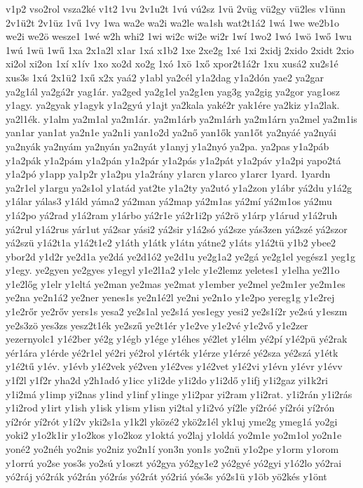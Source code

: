 {v1p2
vso2rol
vsza2ké
v1t2
1vu
2v1u2t
1vú
vú2sz
1vü
2vüg
vü2gy
vü2les
v1ünn
2v1ü2t
2v1üz
1vű
1vy
1wa
wa2e
wa2i
wa2le
wa1sh
wat2t1á2
1wá
1we
we2b1o
we2i
we2ö
wesze1
1wé
w2h
whi2
1wi
wi2c
wi2e
wi2r
1wí
1wo2
1wó
1wö
1wő
1wu
1wú
1wü
1wű
1xa
2x1a2l
x1ar
1xá
x1b2
1xe
2xe2g
1xé
1xi
2xidj
2xido
2xidt
2xio
xi2ol
xi2on
1xí
x1ív
1xo
xo2d
xo2g
1xó
1xö
1xő
xpor2t1á2r
1xu
xusá2
xu2s1é
xus3s
1xú
2x1ü2
1xű
x2x
yaá2
y1abl
ya2cél
y1a2dag
y1a2dón
yae2
ya2gar
ya2g1ál
ya2gá2r
yag1ár.
ya2ged
ya2g1el
ya2g1en
yag3g
ya2gig
ya2gor
yag1osz
y1agy.
ya2gyak
y1agyk
y1a2gyú
y1ajt
ya2kala
yaké2r
yak1ére
ya2kiz
y1a2lak.
ya2l1ék.
y1alm
ya2m1al
ya2m1ár.
ya2m1árb
ya2m1árh
ya2m1árn
ya2mel
ya2m1is
yan1ar
yan1at
ya2n1e
ya2n1i
yan1o2d
ya2nő
yan1ők
yan1őt
ya2nyáé
ya2nyái
ya2nyák
ya2nyám
ya2nyán
ya2nyát
y1anyj
y1a2nyó
ya2pa.
ya2pas
y1a2páb
y1a2pák
y1a2pám
y1a2pán
y1a2pár
y1a2pás
y1a2pát
y1a2páv
y1a2pi
yapo2tá
y1a2pó
y1app
ya1p2r
y1a2pu
y1a2rány
y1arcn
y1arco
y1arcr
1yard.
1yardn
ya2r1el
y1argu
ya2s1ol
y1atád
yat2te
y1a2ty
ya2utó
y1a2zon
y1ábr
yá2du
y1á2g
y1álar
yálas3
y1áld
yáma2
yá2man
yá2map
yá2m1as
yá2mí
yá2m1os
yá2mu
y1á2po
yá2rad
y1á2ram
y1árbo
yá2r1e
yá2r1i2p
yá2rö
y1árp
y1árud
y1á2ruh
yá2rul
y1á2rus
yár1ut
yá2sar
yási2
yá2sir
y1á2só
yá2sze
yás3zen
yá2szé
yá2szor
yá2szü
y1á2t1a
y1á2t1e2
y1áth
y1átk
y1átn
yátne2
y1áts
y1á2tü
y1b2
ybee2
ybor2d
y1d2r
ye2d1a
ye2dá
ye2d1ó2
ye2d1u
ye2g1a2
ye2gá
ye2g1el
yegész1
yeg1g
y1egy.
ye2gyen
ye2gyes
y1egyl
y1e2l1a2
y1elc
y1e2lemz
yeletes1
y1elha
ye2l1o
y1e2lőg
y1elr
y1eltá
ye2man
ye2mas
ye2mat
y1ember
ye2mel
ye2m1er
ye2m1es
ye2na
ye2n1á2
ye2ner
yenes1s
ye2n1é2l
ye2ni
ye2n1o
y1e2po
yereg1g
y1e2rej
y1e2rőr
ye2rőv
yers1s
yesa2
ye2s1al
ye2s1á
yes1egy
yesi2
ye2s1í2r
ye2sú
y1eszm
ye2s3zö
yes3zs
yesz2t1ék
ye2szű
ye2t1ér
y1e2ve
y1e2vé
y1e2vő
y1e2zer
yezernyolc1
y1é2ber
yé2g
y1égb
y1ége
y1éhes
yé2let
y1élm
yé2pí
y1é2pü
yé2rak
yér1ára
y1érde
yé2r1el
yé2ri
yé2rol
y1érték
y1érze
y1érzé
yé2sza
yé2szá
y1étk
y1é2tű
y1év.
y1évb
y1é2vek
yé2ven
y1é2ves
y1é2vet
y1é2vi
y1évn
y1évr
y1évv
y1f2l
y1f2r
yha2d
y2h1adó
y1icc
y1i2de
y1i2do
y1i2dő
y1ifj
y1i2gaz
yi1k2ri
y1i2má
y1imp
yi2nas
y1ind
y1inf
y1inge
y1i2par
yi2ram
y1i2rat.
y1i2rán
y1i2rás
y1i2rod
y1irt
y1ish
y1isk
y1ism
y1isn
yi2tal
y1i2vó
yí2le
yí2róé
yí2rói
yí2rón
yí2rór
yí2rót
y1í2v
yki2s1a
y1k2l
yközé2
ykö2z1él
yk1uj
yme2g
ymeg1á
yo2gi
yoki2
y1o2k1ir
y1o2kos
y1o2koz
y1oktá
yo2laj
y1oldá
yo2m1e
yo2m1ol
yo2n1e
yoné2
yo2néh
yo2nis
yo2niz
yo2n1í
yon3n
yon1s
yo2nü
y1o2pe
y1orm
y1orom
y1orrú
yo2se
yos3s
yo2sú
y1oszt
yó2gya
yó2gy1e2
yó2gyé
yó2gyi
y1ó2lo
yó2rai
yó2ráj
yó2rák
yó2rán
yó2rás
yó2rát
yó2riá
yós3s
yó2s1ü
y1öb
yö2kés
y1önt
}
